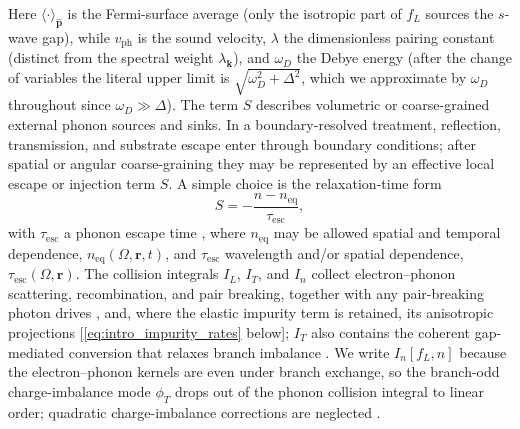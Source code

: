 \documentclass[
  aps,
  prb,
  preprint,
  superscriptaddress,
  longbibliography,
  nofootinbib
]{revtex4-2}
\newcommand{\br}{\mathbf{r}}
\newcommand{\bk}{\mathbf{k}}
\newcommand{\bp}{\mathbf{p}}
\newcommand{\fL}{f_L}
\begin{document}
Here \(\langle\cdot\rangle_{\hat{\bp}}\) is the Fermi-surface
average (only the isotropic part of \(\fL\) sources the \(s\)-wave
gap), while \(v_{\mathrm{ph}}\) is the sound velocity, \(\lambda\) the
dimensionless pairing constant (distinct from the spectral weight
\(\lambda_{\bk}\)), and \(\omega_D\) the Debye energy
(after the change of variables the literal upper limit is
\(\sqrt{\omega_D^{2}+\Delta^{2}}\), which we approximate by
\(\omega_D\) throughout since \(\omega_D\gg\Delta\)). The term
\(S\) describes volumetric or coarse-grained external phonon sources and
sinks. In a boundary-resolved treatment, reflection, transmission, and
substrate escape enter through boundary conditions; after spatial or
angular coarse-graining they may be represented by an effective local
escape or injection term \(S\). A simple choice is the relaxation-time
form
\begin{equation}
  S
  =
  -\frac{n-n_{\mathrm{eq}}}{\tau_{\mathrm{esc}}},
  \label{eq:intro_phonon_escape}
\end{equation}
with \(\tau_{\mathrm{esc}}\) a phonon escape time
\cite{rothwarf1967}, where \(n_{\mathrm{eq}}\) may be allowed
spatial and temporal dependence, \(n_{\mathrm{eq}}(\Omega,\br,t)\),
and \(\tau_{\mathrm{esc}}\) wavelength and/or spatial dependence,
\(\tau_{\mathrm{esc}}(\Omega,\br)\). The collision integrals \(I_{L}\), \(I_{T}\), and
\(I_{n}\) collect electron--phonon scattering, recombination, and
pair breaking, together with any pair-breaking photon drives
\cite{kaplan1976,changscalapino1977,goldie2013}, and, where the elastic
impurity term is retained, its anisotropic projections
[\cref{eq:intro_impurity_rates} below]; \(I_{T}\) also
contains the coherent gap-mediated conversion that relaxes branch
imbalance \cite{tinkham2004,kopnin2001}. We write \(I_{n}[\fL,n]\)
because the electron--phonon kernels are even under branch exchange, so
the branch-odd charge-imbalance mode \(\phi_T\) drops out of the phonon
collision integral to linear order; quadratic charge-imbalance corrections
are neglected \cite{kaplan1976,changscalapino1977}.
\end{document}
